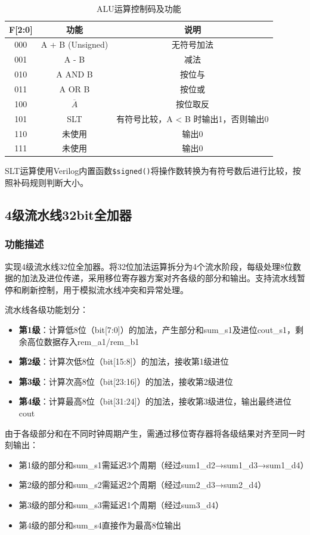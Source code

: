 \begin{table}[htp]
    \centering
    \begin{tabular}{ccc}
        \hline
        F[2:0] & 功能 & 说明 \\
        \hline
        000 & A + B (Unsigned) & 无符号加法 \\
        001 & A - B & 减法 \\
        010 & A AND B & 按位与 \\
        011 & A OR B & 按位或 \\
        100 & $\overline{A}$ & 按位取反 \\
        101 & SLT & 有符号比较，A < B 时输出1，否则输出0 \\
        110 & 未使用 & 输出0 \\
        111 & 未使用 & 输出0 \\
        \hline
    \end{tabular}
    \caption{ALU运算控制码及功能}
    \label{tab:alu_opcode}
\end{table}

SLT运算使用Verilog内置函数\texttt{\$signed()}将操作数转换为有符号数后进行比较，按照补码规则判断大小。

\subsection{4级流水线32bit全加器}\label{sub:ctl}

\subsubsection{功能描述}
实现4级流水线32位全加器。将32位加法运算拆分为4个流水阶段，每级处理8位数据的加法及进位传递，采用移位寄存器方案对齐各级的部分和输出。支持流水线暂停和刷新控制，用于模拟流水线冲突和异常处理。

流水线各级功能划分：
\begin{itemize}
    \item \textbf{第1级}：计算低8位（bit[7:0]）的加法，产生部分和sum\_s1及进位cout\_s1，剩余高位数据存入rem\_a1/rem\_b1
    \item \textbf{第2级}：计算次低8位（bit[15:8]）的加法，接收第1级进位
    \item \textbf{第3级}：计算次高8位（bit[23:16]）的加法，接收第2级进位
    \item \textbf{第4级}：计算最高8位（bit[31:24]）的加法，接收第3级进位，输出最终进位cout
\end{itemize}

由于各级部分和在不同时钟周期产生，需通过移位寄存器将各级结果对齐至同一时刻输出：
\begin{itemize}
    \item 第1级的部分和sum\_s1需延迟3个周期（经过sum1\_d2→sum1\_d3→sum1\_d4）
    \item 第2级的部分和sum\_s2需延迟2个周期（经过sum2\_d3→sum2\_d4）
    \item 第3级的部分和sum\_s3需延迟1个周期（经过sum3\_d4）
    \item 第4级的部分和sum\_s4直接作为最高8位输出
\end{itemize}

